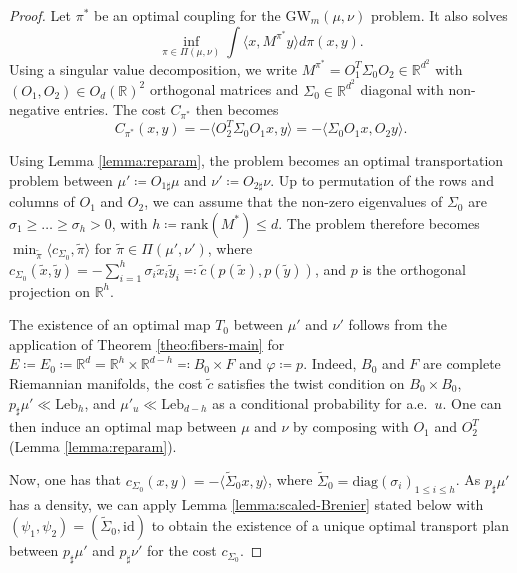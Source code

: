 \documentclass{article}
\newcommand{\R}{\mathbb{R}}
\newcommand{\1}{\mathbf{1}}
\newcommand{\GW}{\mathrm{GW}}
\newcommand{\Leb}{\mathrm{Leb}}
\theoremstyle{definition}
\theoremstyle{remark}
\begin{document}
\begin{appendices}
\begin{proof}
    
    Let $\pi^*$ be an optimal coupling for the $\GW_m(\mu,\nu)$ problem. It also solves \[\inf_{\pi\in\Pi(\mu,\nu)}\int\langle x,M^{\pi^*} y\rangle d\pi(x,y).\]
    Using a singular value decomposition, we write $M^{\pi^*}=O_1^T \Sigma_0 O_2\in\R^{d^2}$ with $(O_1,O_2)\in O_d(\R)^2$ orthogonal matrices and $\Sigma_0\in\R^{d^2}$ diagonal with non-negative entries. The cost $C_{\pi^*}$ then becomes
        \begin{equation*}
        C_{\pi^*}(x, y)=-\langle O_2^T\Sigma_0O_1 x,y\rangle =-\langle \Sigma_0O_1 x, O_2 y\rangle.
        \end{equation*}
        
    Using Lemma \ref{lemma:reparam}, the problem becomes an optimal transportation problem between $\mu'\coloneqq O_{1\sharp}\mu$ and $\nu'\coloneqq O_{2\sharp}\nu$. Up to permutation of the rows and columns of $O_1$ and $O_2$, we can assume that the non-zero eigenvalues of $\Sigma_0$ are $\sigma_1 \geq \dots \geq \sigma_h>0$, with $h\coloneqq \mathrm{rank}(M^*)\leq d$. The problem therefore becomes $\min_{\tilde\pi} \langle c_{\Sigma_0}, \tilde\pi\rangle$ for $\tilde\pi \in \Pi(\mu', \nu')$, where $c_{\Sigma_0}(\tilde x,\tilde y)=-\sum_{i=1}^h \sigma_i \tilde x_i \tilde y_i\eqqcolon \tilde c( p(\tilde x), p(\tilde y))$, and $p$ is the orthogonal projection on $\R^h$.

    
    The existence of an optimal map $T_0$ between $\mu'$ and $\nu'$ follows from the application of Theorem \ref{theo:fibers-main} for $E\coloneqq E_0\coloneqq \R^d=\R^h\times\R^{d-h}\eqqcolon B_0\times F$ and $\varphi\coloneqq p$. Indeed, $B_0$ and $F$ are complete Riemannian manifolds, the cost $\tilde c$ satisfies the twist condition on $B_0\times B_0$, $p_\sharp\mu'\ll\Leb_h$, and $\mu'_u\ll\Leb_{d-h}$ as a conditional probability for a.e.~$u$. One can then induce an optimal map between $\mu$ and $\nu$ by composing with $O_1$ and $O_2^T$ (Lemma \ref{lemma:reparam}).
    
    Now, one has that $c_{\Sigma_0}(x,y)=-\langle \tilde\Sigma_0x,y\rangle$, where $\tilde\Sigma_0=\mathrm{diag}({\sigma_i})_{1\leq i\leq h}$. As $p_\sharp\mu'$ has a density, we can apply Lemma \ref{lemma:scaled-Brenier} stated below with $(\psi_1,\psi_2)=(\tilde\Sigma_0,\mathrm{id})$ to obtain the existence of a unique optimal transport plan between $p_\sharp\mu'$ and $p_\sharp\nu'$ for the cost $c_{\Sigma_0}$.
    
\end{proof}



\end{appendices}
\end{document}
